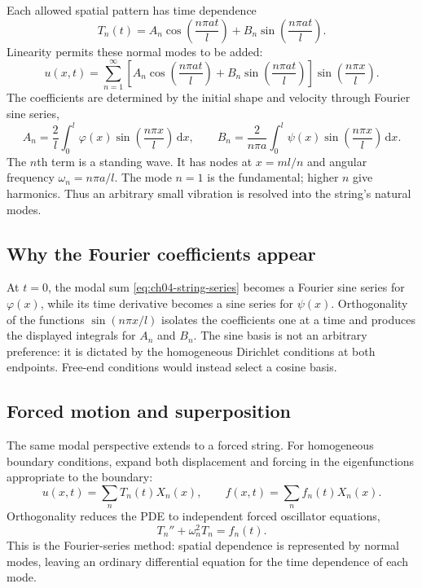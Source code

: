 Each allowed spatial pattern has time dependence
\begin{equation}
T_n(t)=A_n\cos\left(\frac{n\pi at}{l}\right)
+B_n\sin\left(\frac{n\pi at}{l}\right).
\end{equation}
Linearity permits these normal modes to be added:
\begin{equation}
u(x,t)=\sum_{n=1}^{\infty}
\left[A_n\cos\left(\frac{n\pi at}{l}\right)
+B_n\sin\left(\frac{n\pi at}{l}\right)\right]
\sin\left(\frac{n\pi x}{l}\right).
\label{eq:ch04-string-series}
\end{equation}
The coefficients are determined by the initial shape and velocity through Fourier sine series,
\begin{equation}
A_n=\frac{2}{l}\int_0^l\varphi(x)\sin\left(\frac{n\pi x}{l}\right)\,\mathrm dx,
\qquad
B_n=\frac{2}{n\pi a}\int_0^l\psi(x)\sin\left(\frac{n\pi x}{l}\right)\,\mathrm dx.
\end{equation}
The $n$th term is a standing wave. It has nodes at $x=ml/n$ and angular frequency $\omega_n=n\pi a/l$. The mode $n=1$ is the fundamental; higher $n$ give harmonics. Thus an arbitrary small vibration is resolved into the string's natural modes.

\subsection{Why the Fourier coefficients appear}

At $t=0$, the modal sum \eqref{eq:ch04-string-series} becomes a Fourier sine series for $\varphi(x)$, while its time derivative becomes a sine series for $\psi(x)$. Orthogonality of the functions $\sin(n\pi x/l)$ isolates the coefficients one at a time and produces the displayed integrals for $A_n$ and $B_n$. The sine basis is not an arbitrary preference: it is dictated by the homogeneous Dirichlet conditions at both endpoints. Free-end conditions would instead select a cosine basis.

\subsection{Forced motion and superposition}

The same modal perspective extends to a forced string. For homogeneous boundary conditions, expand both displacement and forcing in the eigenfunctions appropriate to the boundary:
\begin{equation}
u(x,t)=\sum_n T_n(t)X_n(x),
\qquad
f(x,t)=\sum_n f_n(t)X_n(x).
\end{equation}
Orthogonality reduces the PDE to independent forced oscillator equations,
\begin{equation}
T_n''+\omega_n^2T_n=f_n(t).
\end{equation}
This is the Fourier-series method: spatial dependence is represented by normal modes, leaving an ordinary differential equation for the time dependence of each mode.


